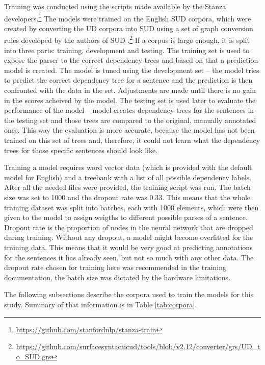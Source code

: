 Training was conducted using the scripts made available by the Stanza developers.\footnote{\url{https://github.com/stanfordnlp/stanza-train}} The models were trained on the English SUD corpora, which were created by converting the UD corpora into SUD using a set of graph conversion rules developed by the authors of SUD \citep{gerdes-etal-2018-sud}.\footnote{\url{https://github.com/surfacesyntacticud/tools/blob/v2.12/converter/grs/UD\_to\_SUD.grs}} If a corpus is large enough, it is split into three parts: training, development and testing. The training set is used to expose the parser to the correct dependency trees and based on that a prediction model is created. The model is tuned using the development set -- the model tries to predict the correct dependency tree for a sentence and the prediction is then confronted with the data in the set. Adjustments are made until there is no gain in the scores acheived by the model. The testing set is used later to evaluate the performance of the model -- model creates dependency trees for the sentences in the testing set and those trees are compared to the original, manually annotated ones. This way the evaluation is more accurate, because the model has not been trained on this set of trees and, therefore, it could not learn what the dependency trees for those specific sentences should look like.

Training a model requires word vector data (which is provided with the default model for English) and a treebank with a list of all possible dependency labels. After all the needed files were provided, the training script was run. The batch size was set to 1000 and the dropout rate was 0.33. This means that the whole training dataset was split into batches, each with 1000 elements, which were then given to the model to assign weigths to different possible parses of a sentence. Dropout rate is the proportion of nodes in the neural network that are dropped during training. Without any dropout, a model might become overfitted for the training data. This means that it would be very good at predicting annotations for the sentences it has already seen, but not so much with any other data. The dropout rate chosen for training here was recommended in the training documentation, the batch size was dictated by the hardware limitations.

The following subsections describe the corpora used to train the models for this study. Summary of that information is in Table \ref{tab:corpora}.

